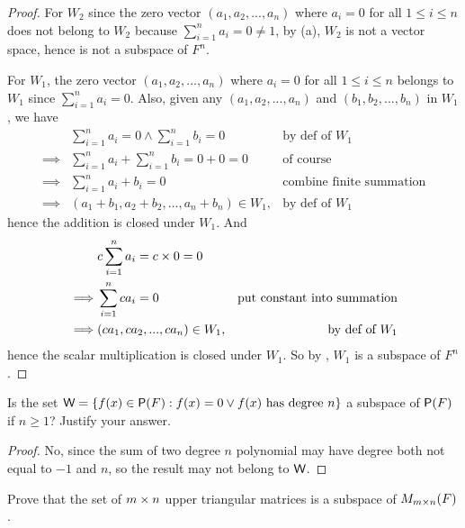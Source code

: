 \begin{proof}
For \(W_2\) since the zero vector \((a_1, a_2, ..., a_n)\) where \(a_i = 0\) for all \(1 \le i \le n\) does not belong to \(W_2\) because \(\sum_{i = 1}^{n} a_i = 0 \ne 1\), by (a), \(W_2\) is not a vector space, hence is not a subspace of \(F^n\).

For \(W_1\), the zero vector \((a_1, a_2, ..., a_n)\) where \(a_i = 0\) for all \(1 \le i \le n\) belongs to \(W_1\) since \(\sum_{i = 1}^{n} a_i = 0\).
Also, given any \((a_1, a_2, ..., a_n)\) and \((b_1, b_2, ..., b_n)\) in \(W_1\), we have
\begin{align*}
             & \sum_{i = 1}^{n} a_i = 0 \land \sum_{i = 1}^{n} b_i = 0 & \text{by def of \(W_1\)} \\
    \implies & \sum_{i = 1}^{n} a_i + \sum_{i = 1}^{n} b_i = 0 + 0 = 0 & \text{of course} \\
    \implies & \sum_{i = 1}^{n} a_i + b_i = 0 & \text{combine finite summation} \\
    \implies & (a_1 + b_1, a_2 + b_2, ..., a_n + b_n) \in W_1, & \text{by def of \(W_1\)}
\end{align*}
hence the addition is closed under \(W_1\).
And
\begin{align*}
             & c \sum_{i = 1}^{n} a_i = c \times 0 = 0 \\
    \implies & \sum_{i = 1}^{n} c a_i = 0 & \text{put constant into summation} \\
    \implies & (c a_1, c a_2, ..., c a_n) \in W_1, & \text{by def of \(W_1\)}
\end{align*}
hence the scalar multiplication is closed under \(W_1\).
So by , \(W_1\) is a subspace of \(F^n\).
\end{proof}

\begin{exercise} \label{exercise 1.3.11}
Is the set \(\textsf{W} = \{f(x) \in \textsf{P}(F): f(x) = 0 \lor f(x) \text{ has degree } n\}\) a subspace of \(\textsf{P}(F)\) if \(n \ge 1\)?
Justify your answer.
\end{exercise}

\begin{proof}
No, since the sum of two degree \(n\) polynomial may have degree both not equal to \(-1\) and \(n\), so the result may not belong to \(\textsf{W}\).
\end{proof}

\begin{exercise} \label{exercise 1.3.12}
Prove that the set of \(m \times n\) upper triangular matrices is a subspace of \(M_{m \times n}(F)\).
\end{exercise}

